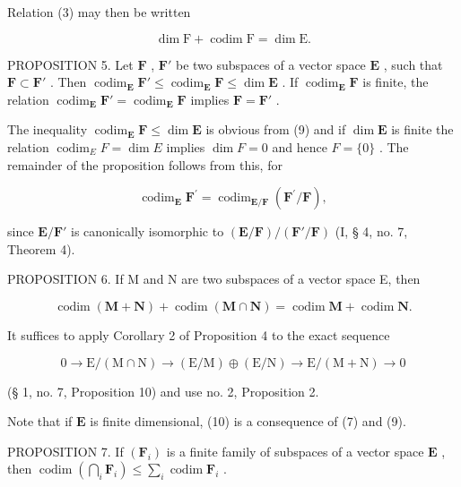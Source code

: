 Relation (3) may then be written

\[
\dim \mathrm{F} + \operatorname{codim} \mathrm{F} = \dim \mathrm{E}.\tag{9}
\]

PROPOSITION 5. Let \(\mathbf{F}\) , \(\mathbf{F}'\) be two subspaces of a vector space \(\mathbf{E}\) , such that \(\mathbf{F} \subset \mathbf{F}'\) . Then \(\operatorname{codim}_{\mathbf{E}} \mathbf{F}' \leqslant \operatorname{codim}_{\mathbf{E}} \mathbf{F} \leqslant \dim \mathbf{E}\) . If \(\operatorname{codim}_{\mathbf{E}} \mathbf{F}\) is finite, the relation \(\operatorname{codim}_{\mathbf{E}} \mathbf{F}' = \operatorname{codim}_{\mathbf{E}} \mathbf{F}\) implies \(\mathbf{F} = \mathbf{F}'\) .

The inequality \(\operatorname{codim}_{\mathbf{E}} \mathbf{F} \leqslant \dim \mathbf{E}\) is obvious from (9) and if \(\dim \mathbf{E}\) is finite the relation \(\operatorname{codim}_{E} F = \dim E\) implies \(\dim F = 0\) and hence \(F = \{0\}\) . The remainder of the proposition follows from this, for

\[
\operatorname{codim} _ {\mathbf {E}} \mathbf {F} ^ {\prime} = \operatorname{codim} _ {\mathbf {E} / \mathbf {F}} (\mathbf {F} ^ {\prime} / \mathbf {F}),
\]

since \(\mathbf{E} / \mathbf{F}'\) is canonically isomorphic to \((\mathbf{E} / \mathbf{F}) / (\mathbf{F}' / \mathbf{F})\) (I, § 4, no. 7, Theorem 4).

PROPOSITION 6. If M and N are two subspaces of a vector space E, then

\[
\operatorname{codim} (\mathbf {M} + \mathbf {N}) + \operatorname{codim} (\mathbf {M} \cap \mathbf {N}) = \operatorname{codim} \mathbf {M} + \operatorname{codim} \mathbf {N}.\tag{10}
\]

It suffices to apply Corollary 2 of Proposition 4 to the exact sequence

\[
0 \rightarrow \mathrm{E} / (\mathrm{M} \cap \mathrm{N}) \rightarrow (\mathrm{E} / \mathrm{M}) \oplus (\mathrm{E} / \mathrm{N}) \rightarrow \mathrm{E} / (\mathrm{M} + \mathrm{N}) \rightarrow 0
\]

(§ 1, no. 7, Proposition 10) and use no. 2, Proposition 2.

Note that if \(\mathbf{E}\) is finite dimensional, (10) is a consequence of (7) and (9).

PROPOSITION 7. If \((\mathbf{F}_i)\) is a finite family of subspaces of a vector space \(\mathbf{E}\) , then \(\operatorname{codim}\left(\bigcap_i \mathbf{F}_i\right) \leqslant \sum_i \operatorname{codim} \mathbf{F}_i\) .

